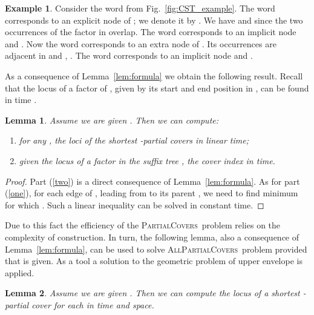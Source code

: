 \documentclass{article}
\theoremstyle{theorem}
\newtheorem{lemma}{Lemma}
\theoremstyle{definition}
\newtheorem{example}{Example}
\newcommand{\PC}{{\textsc{PartialCovers}}}
\newcommand{\APC}{{\textsc{AllPartialCovers}}}
\begin{document}
  \begin{example}
    Consider the word  from Fig.~\ref{fig:CST_example}.
    The word  corresponds to an explicit node of ; we denote it by .
    We have  and  since the two occurrences of the factor  
    in  overlap.
    The word  corresponds to an implicit node  and .
    Now the word  corresponds to an extra node  of .
    Its occurrences are adjacent in  and , .
    The word  corresponds to an implicit node  and .
  \end{example}


  \noindent
  As a consequence of Lemma~\ref{lem:formula} we obtain the following result.
  Recall that the locus of a factor  of , given by its start and end position
  in , can be found in  time \cite{DBLP:conf/cpm/KucherovNS12}.
  \begin{lemma}\label{lem:if_CST}
    Assume we are given .
    Then we can compute:
    \begin{enumerate}[(1)]
      \item\label{one} for any , the loci of the shortest -partial covers in linear time;
      \item\label{two} given the locus of a factor  in the suffix tree
      , the cover index  in  time.
    \end{enumerate}
  \end{lemma}
  \begin{proof}
    Part (\ref{two}) is a direct consequence of Lemma~\ref{lem:formula}.
    As for part (\ref{one}), for each edge of , leading from  to its parent ,
    we need to find minimum  for which
    .
    Such a linear inequality can be solved in constant time.
  \end{proof}
  Due to this fact the efficiency of the \PC\ problem
  relies on the complexity of  construction.
  In turn, the following lemma, also a consequence of Lemma~\ref{lem:formula},
  can be used to solve \APC\ problem
  provided that  is given.
  As a tool a solution to the geometric problem of upper envelope
  \cite{DBLP:journals/ipl/Hershberger89} is applied.
  \begin{lemma}\label{lem:all_if_CST}
    Assume we are given .
    Then we can compute the locus of a shortest -partial cover
    for each  in  time and  space.
  \end{lemma}
\end{document}
